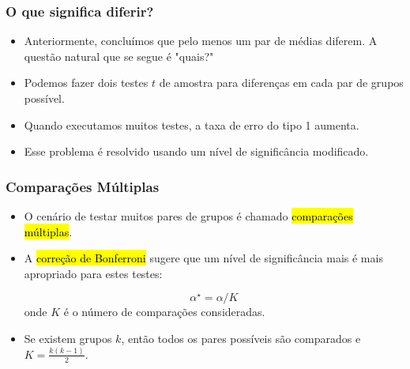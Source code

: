 
\begin{frame}
\frametitle{O que significa diferir?}

\begin{itemize}
\justifying
\item Anteriormente, concluímos que pelo menos um par de médias diferem. A questão natural que se segue é "quais?"

\pause
\justifying
\item Podemos fazer dois testes $ t $ de amostra para diferenças em cada par de grupos possível.

\pause

\end{itemize}
\justifying
{}

\pause

\begin{itemize}
\justifying
\item Quando executamos muitos testes, a taxa de erro do tipo 1 aumenta.
\justifying
\item Esse problema é resolvido usando um nível de significância modificado.

\end{itemize}

\end{frame}


\begin{frame}
\frametitle{Comparações Múltiplas}

\begin{itemize}
\justifying
\item O cenário de testar muitos pares de grupos é chamado \hl{comparações múltiplas}.

\pause
\justifying
\item A \hl{correção de Bonferroni} sugere que um nível de significância mais  é mais apropriado para estes testes:

\[ \alpha^\star = \alpha / K \]
\justifying
onde $K$ é o número de comparações consideradas.

\pause
\justifying
\item Se existem grupos $k$, então todos os pares possíveis são comparados e $K = \frac{k (k - 1)}{2}$.

\end{itemize}

\end{frame}

